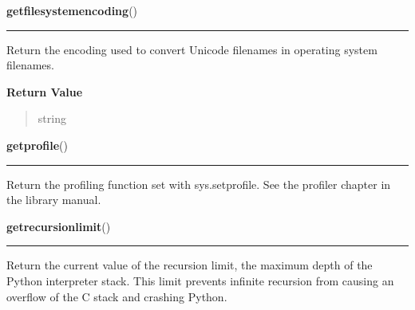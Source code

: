     \label{sys:getfilesystemencoding}

    \vspace{0.5ex}

\hspace{.8\funcindent}\begin{boxedminipage}{\funcwidth}

    \raggedright \textbf{getfilesystemencoding}()

    \vspace{-1.5ex}

    \rule{\textwidth}{0.5\fboxrule}
\setlength{\parskip}{2ex}
    Return the encoding used to convert Unicode filenames in operating 
    system filenames.

\setlength{\parskip}{1ex}
      \textbf{Return Value}
    \vspace{-1ex}

      \begin{quote}
      string

      \end{quote}

    \end{boxedminipage}

    \label{sys:getprofile}

    \vspace{0.5ex}

\hspace{.8\funcindent}\begin{boxedminipage}{\funcwidth}

    \raggedright \textbf{getprofile}()

    \vspace{-1.5ex}

    \rule{\textwidth}{0.5\fboxrule}
\setlength{\parskip}{2ex}
    Return the profiling function set with sys.setprofile. See the profiler
    chapter in the library manual.

\setlength{\parskip}{1ex}
    \end{boxedminipage}

    \label{sys:getrecursionlimit}

    \vspace{0.5ex}

\hspace{.8\funcindent}\begin{boxedminipage}{\funcwidth}

    \raggedright \textbf{getrecursionlimit}()

    \vspace{-1.5ex}

    \rule{\textwidth}{0.5\fboxrule}
\setlength{\parskip}{2ex}
    Return the current value of the recursion limit, the maximum depth of 
    the Python interpreter stack.  This limit prevents infinite recursion 
    from causing an overflow of the C stack and crashing Python.

\setlength{\parskip}{1ex}
    \end{boxedminipage}


